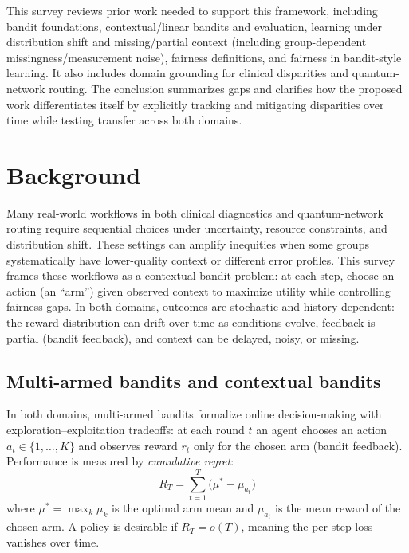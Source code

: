 \documentclass[conference]{IEEEtran}
\begin{document}
This survey reviews prior work needed to support this framework, including bandit foundations,
contextual/linear bandits and evaluation, learning under distribution shift and
missing/partial context (including group-dependent missingness/measurement noise),
fairness definitions, and fairness in bandit-style learning. It also includes domain grounding
for clinical disparities and quantum-network routing. The conclusion summarizes gaps and
clarifies how the proposed work differentiates itself by explicitly tracking and mitigating
disparities over time while testing transfer across both domains.


\section{Background}
Many real-world workflows in both clinical diagnostics and quantum-network routing require
sequential choices under uncertainty, resource constraints, and distribution shift. These
settings can amplify inequities when some groups systematically have lower-quality context
or different error profiles. This survey frames these workflows as a contextual bandit
problem: at each step, choose an action (an ``arm'') given observed context to maximize
utility while controlling fairness gaps.
In both domains, outcomes are stochastic and history-dependent: the reward distribution can
drift over time as conditions evolve, feedback is partial (bandit feedback), and context can
be delayed, noisy, or missing.

\subsection{Multi-armed bandits and contextual bandits}
In both domains, multi-armed bandits formalize online decision-making with
exploration--exploitation tradeoffs: at each round $t$ an agent chooses an action
$a_t \in \{1,\ldots,K\}$ and observes reward $r_t$ only for the chosen arm (bandit feedback).
Performance is measured by \emph{cumulative regret}:
\begin{equation}
R_T = \sum_{t=1}^{T} \bigl(\mu^* - \mu_{a_t}\bigr)
\label{eq:regret}
\end{equation}
where $\mu^* = \max_k \mu_k$ is the optimal arm mean and $\mu_{a_t}$ is the mean reward of
the chosen arm. A policy is desirable if $R_T = o(T)$, meaning the per-step loss vanishes
over time.
\end{document}
